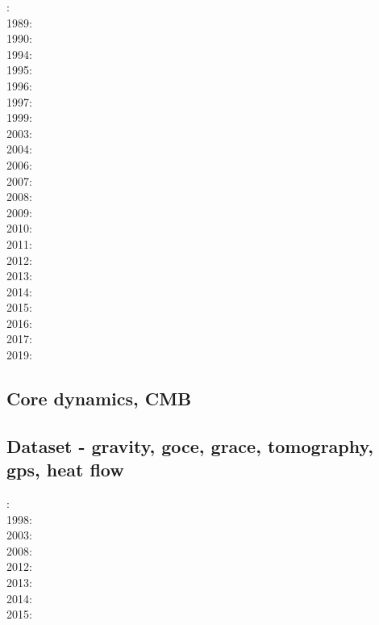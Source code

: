 : \cite{yusa84}\\
1989: \cite{blbc89}\\
1990: \cite{trab90}\\
1994: \cite{brsa94}\\
1995: \cite{brsa95}\\
1996: \cite{zhon96}\\
1997: \cite{rist97}\\
1999: \cite{lind99}\\
2003: \cite{taki03}\\
2004: \cite{kaps04}\cite{kasa04}\cite{kaks08}\\
2006: \cite{kapo06}\\
2007: \cite{toma07}\cite{chcc07}\cite{kabe07}\cite{kaks07}\\
2008: \cite{zhmt08}\cite{deka08}\cite{trub08}\cite{krdp08}\\
2009: \cite{king09}\\
2010: \cite{kaus10}\cite{kamm10}\\
2011: \cite{dumg11}\cite{uibb11}\\
2012: \cite{crsg12}\cite{chgv12}\cite{krwd12}\\
2013: \cite{chtl13}\cite{kemk13}\\
2014: \cite{thmk14}\\
2015: \cite{lelk15}\cite{rumi15}\cite{chpe15}\\
2016: \cite{dumy16}\cite{blmp16}\\
2017: \cite{robh17}\cite{wisv17}\\
2019: \cite{clhe19}

\subsection*{Core dynamics, CMB}

\cite{hayu96}
\cite{lahb08}

\subsection*{Dataset - gravity, goce, grace, tomography, gps, heat flow}

: \cite{dzan81}\\
1998: \cite{bisp98}\\
2003: \cite{krhh03}\cite{sosi03}\\
2008: \cite{zhou08}\\
2012: \cite{hawj12}\cite{resa12}\cite{hawj12}\\
2013: \cite{ress13}\cite{ebbf13}\cite{davi13}\\
2014: \cite{paml14}\cite{ebbf14}\cite{krbk14}\\
2015: \cite{boem15}

